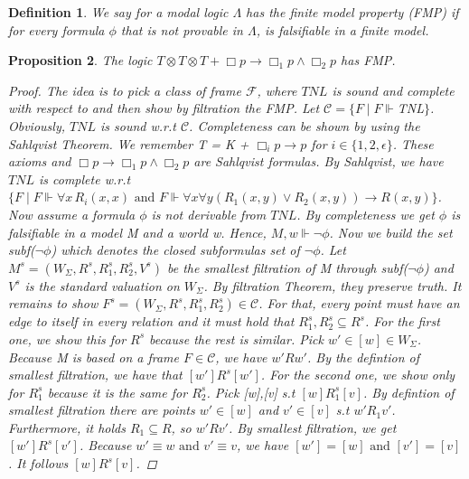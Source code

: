 \documentclass[12pt, a4paper]{scrartcl}
\newtheorem{definition}{Definition}[subsection]
\newtheorem{proposition}[definition]{Proposition}
\begin{document}
\begin{definition}
    We say for a modal logic $\Lambda$ has the finite model property (FMP) if for every formula $\phi$ that is not provable in $\Lambda$,
    is falsifiable in a finite model.
        
\end{definition}

\begin{proposition}
    The logic $T \otimes T \otimes T + \Box p \rightarrow \Box_1 p \land \Box_2 p$ has FMP.
    \begin{proof}
    The idea is to pick a class of frame $\mathcal{F}$, where $TNL$ is sound and complete with respect to and then show by filtration the FMP. \newline \newline
    Let $\mathcal{C} = \{F \mid F \Vdash $TNL$\}$. Obviously,  $TNL$ is sound w.r.t $\mathcal{C}$. Completeness can be shown by using the Sahlqvist Theorem.
    We remember T = K + $\Box_i p \rightarrow p$ for $i \in \{1,2, \epsilon\}$. These axioms and $\Box p \rightarrow \Box_1 p \land \Box_2 p$ are Sahlqvist formulas. 
    By Sahlqvist, we have $TNL$ is complete w.r.t $\{F \mid F \Vdash \forall x \, R_i(x,x) \mbox{ and } F \Vdash \forall x \forall y (R_1(x,y) \lor R_2(x,y)) \rightarrow R(x,y)\}$. \newline \newline
    Now assume a formula $\phi$ is not derivable from $TNL$. By completeness we get $\phi$ is falsifiable in a model M and a world w. Hence, $M,w \Vdash \neg \phi$. Now we build the set subf($\neg \phi$) which denotes the closed subformulas set of $\neg \phi$.
    Let $M^s = (W_\Sigma, R^s, R^s_1, R^s_2, V^s)$ be the smallest filtration of M through subf($\neg \phi$) and $V^s$ is the standard valuation on $W_\Sigma$. By filtration Theorem, they preserve truth.
    It remains to show $F^s = (W_\Sigma, R^s, R^s_1, R^s_2)\in  \mathcal{C}$. For that, every point must have an edge to itself in every relation and it must hold that $R^s_1,R^s_2 \subseteq R^s$. For the first one, we show this for $R^s$ because the rest is similar.
    Pick $w' \in [w]\in W_\Sigma$. Because M is based on a frame $F \in \mathcal{C}$, we have $w'Rw'$. By the defintion of smallest filtration, we have that $[w']R^s[w']$. For the second one, we show only for $R^s_1$ because it is the same for $R^s_2$.
    Pick [w],[v] s.t $[w]R^s_1[v]$. By defintion of smallest filtration there are points $w' \in [w]$ and $v' \in [v]$ s.t $w'R_1v'$. Furthermore, it holds $R_1 \subseteq R$, so $w'Rv'$.
    By smallest filtration, we get $[w']R^s[v']$. Because $w' \equiv w \mbox{ and } v' \equiv v$, we have $[w'] = [w] \mbox{ and } [v'] = [v]$. It follows $[w]R^s[v]$.
    
    \end{proof}
        
\end{proposition}
\end{document}
